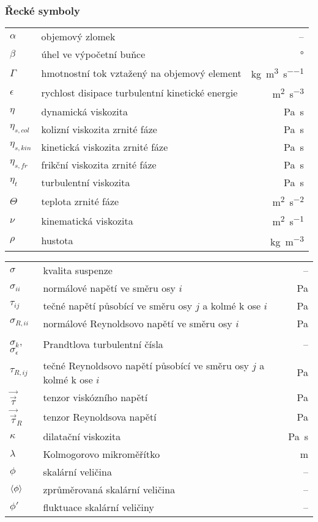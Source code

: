 \subsubsection*{Řecké symboly}
\begin{tabularx}{\textwidth}{@{}p{2.5cm} X r@{}}

$\alpha$ & objemový zlomek & --\\
$\beta$ & úhel ve výpočetní buňce & \si{\degree}\\
$\Gamma$ & hmotnostní tok vztažený na objemový element & \si{\kilogram\per\cubic\meter\per\second} \\ 
$\epsilon$ & rychlost disipace turbulentní kinetické energie & \si{\meter\squared\per\second\cubed}\\
$\eta$ & dynamická viskozita & \si{\pascal\second}\\
$\eta_{s,col}$ & kolizní viskozita zrnité fáze & \si{\pascal\second}\\
$\eta_{s,kin}$ & kinetická viskozita zrnité fáze & \si{\pascal\second}\\
$\eta_{s,fr}$ & frikční viskozita zrnité fáze & \si{\pascal\second}\\
$\eta_{t}$ & turbulentní viskozita & \si{\pascal\second}\\
$\Theta$ & teplota zrnité fáze & \si{\meter\squared\per\second\squared} \\
$\nu$ & kinematická viskozita & \si{\meter\squared\per\second}\\
$\rho$ & hustota & \si{\kilogram\per\cubic\meter} \\
\end{tabularx}
\begin{tabularx}{\textwidth}{@{}p{2.5cm} X r@{}}
$\sigma$ & kvalita suspenze & -- \\
$\sigma_{ii}$ & normálové napětí ve směru osy $i$ & \si{\pascal} \\
$\tau_{ij}$ & tečné napětí působící ve směru osy $j$ a kolmé k ose $i$ & \si{\pascal} \\
$\sigma_{R,ii}$ & normálové Reynoldsovo napětí ve směru osy $i$ & \si{\pascal} \\
$\sigma_{k}$, $\sigma_{\epsilon}$ & Prandtlova turbulentní čísla & -- \\
$\tau_{R,ij}$ & tečné Reynoldsovo napětí působící ve směru osy $j$ a kolmé k ose $i$ & \si{\pascal} \\
$\vec{\vec{\tau}}$ & tenzor viskózního napětí & \si{\pascal} \\
$\vec{\vec{\tau}}_{R}$ & tenzor Reynoldsova napětí & \si{\pascal} \\
$\kappa$ & dilatační viskozita & \si{\pascal\second}\\
$\lambda$ & Kolmogorovo mikroměřítko & \si{\meter}\\
$\phi$ & skalární veličina & --\\
$\left< \phi \right>$ & zprůměrovaná skalární veličina & --\\
$\phi'$ & fluktuace skalární veličiny & --\\

\end{tabularx}

